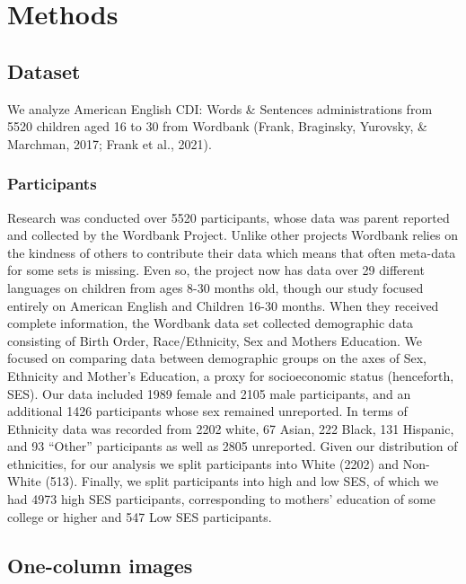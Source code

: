 \documentclass[10pt, letterpaper]{article}
\begin{document}
\hypertarget{methods}{%
\section{Methods}\label{methods}}

\hypertarget{dataset}{%
\subsection{Dataset}\label{dataset}}

We analyze American English CDI: Words \& Sentences administrations from
5520 children aged 16 to 30 from Wordbank (Frank, Braginsky, Yurovsky,
\& Marchman, 2017; Frank et al., 2021).

\hypertarget{participants}{%
\subsubsection{Participants}\label{participants}}

Research was conducted over 5520 participants, whose data was parent
reported and collected by the Wordbank Project. Unlike other projects
Wordbank relies on the kindness of others to contribute their data which
means that often meta-data for some sets is missing. Even so, the
project now has data over 29 different languages on children from ages
8-30 months old, though our study focused entirely on American English
and Children 16-30 months. When they received complete information, the
Wordbank data set collected demographic data consisting of Birth Order,
Race/Ethnicity, Sex and Mothers Education. We focused on comparing data
between demographic groups on the axes of Sex, Ethnicity and Mother's
Education, a proxy for socioeconomic status (henceforth, SES). Our data
included 1989 female and 2105 male participants, and an additional 1426
participants whose sex remained unreported. In terms of Ethnicity data
was recorded from 2202 white, 67 Asian, 222 Black, 131 Hispanic, and 93
``Other'' participants as well as 2805 unreported. Given our
distribution of ethnicities, for our analysis we split participants into
White (2202) and Non-White (513). Finally, we split participants into
high and low SES, of which we had 4973 high SES participants,
corresponding to mothers' education of some college or higher and 547
Low SES participants.

\hypertarget{one-column-images}{%
\subsection{One-column images}\label{one-column-images}}
\end{document}
